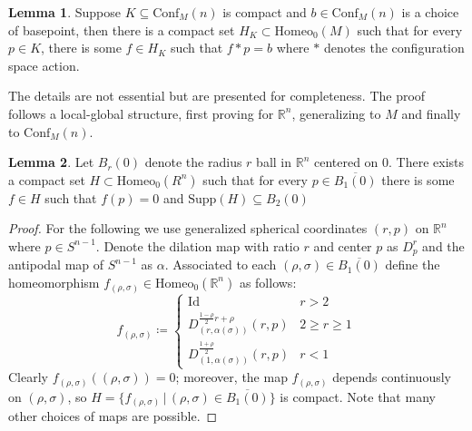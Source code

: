 \documentclass[10pt, oneside]{article}
\newcommand{\R}{\mathbb{R}}
\newcommand{\homeo}[1][S^1]{\text{Homeo}_0(#1)}
\newcommand{\cl}[1]{\overline{#1}}
\newcommand{\conf}[2][S^1]{\text{Conf}_{#2}(#1)}
\theoremstyle{definition}
\newtheorem{lem}{Lemma}[section]
\theoremstyle{definition}
\begin{document}
\begin{lem}\label{lem:cpct-to-basepoint-confM}
    Suppose $K\subseteq\conf[n]{M}$ is compact and $b\in\conf[n]{M}$ is a choice of basepoint, then there is a compact set $H_K\subset\homeo[M]$ such that for every $p\in K$, there is some $f\in H_K$ such that $f*p=b$ where $*$ denotes the configuration space action.
\end{lem} 

The details are not essential but are presented for completeness. The proof follows a local-global structure, first proving for $\R^n$, generalizing to $M$ and finally to $\conf[n]{M}$.

\begin{lem}
    Let $B_r(0)$ denote the radius $r$ ball in $\R^n$ centered on 0. There exists a compact set $H\subset\homeo[R^n]$ such that for every $p\in \cl{B_1(0)}$ there is some $f\in H$ such that $f(p)=0$ and $\text{Supp}(H) \subseteq B_2(0)$ 
\end{lem}
\begin{proof}
    For the following we use generalized spherical coordinates $(r, p)$ on $\R^n$ where $p\in S^{n-1}$. Denote the dilation map with ratio $r$ and center $p$ as $D_p^r$ and the antipodal map of $S^{n-1}$ as $\alpha$. Associated to each $(\rho, \sigma)\in \cl{B_1(0)}$ define the homeomorphism $f_{(\rho, \sigma)}\in\homeo[\R^n]$ as follows:
    \[f_{(\rho,\sigma)} \coloneqq
    \begin{cases}
        \text{Id} & r>2\\[.8em]
        D_{(r,\alpha(\sigma))}^{\frac{1-\rho}{2}r+\rho}(r,p) & 2\geq r \geq 1 \\[1em]
        D_{(1, \alpha(\sigma))}^{\frac{1+\rho}{2}}(r,p) & r < 1
    \end{cases}
    \]
    Clearly $f_{(\rho, \sigma)}((\rho,\sigma))=0$; moreover, the map $f_{(\rho,\sigma)}$ depends continuously on $(\rho,\sigma)$, so $H=\{f_{(\rho,\sigma)}\,\vert\, (\rho,\sigma)\in\cl{B_1(0)}\}$ is compact.
    Note that many other choices of maps are possible.
\end{proof}
\end{document}
